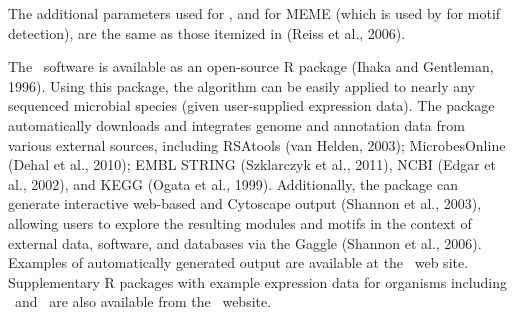 The additional parameters used for \cm, and for MEME (which is
used by \cm for motif detection), are the same as those itemized
in (Reiss et al., 2006).

The \cm\ software is available as an open-source R package (Ihaka
and Gentleman, 1996). Using this package, the algorithm can be easily
applied to nearly any sequenced microbial species (given user-supplied
expression data). The package automatically downloads and integrates
genome and annotation data from various external sources, including
RSAtools (van Helden, 2003); MicrobesOnline (Dehal et al., 2010); EMBL
STRING (Szklarczyk et al., 2011), NCBI (Edgar et al., 2002), and KEGG
(Ogata et al., 1999). Additionally, the package can generate
interactive web-based and Cytoscape output (Shannon et al., 2003),
allowing users to explore the resulting modules and motifs in the
context of external data, software, and databases via the Gaggle
(Shannon et al., 2006). Examples of automatically generated output are
available at the \cm\ web site. Supplementary R packages with
example expression data for organisms including \halo\ and
\eco\ are also available from the \cm\ website.

